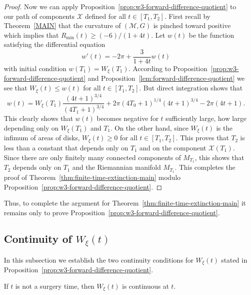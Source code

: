 \begin{proof}
Now we can apply Proposition~\ref{prop:w3-forward-difference-quotient} to our path of components
${\mathcal X}$ defined for all $t\in [T_1,T_2]$. First recall by
Theorem~\ref{MAIN} that the curvature of $({\mathcal M},G)$ is pinched toward
positive which implies that $R_{\min}(t)\ge (-6)/(1+4t)$. Let $w(t)$ be the
function satisfying the differential equation
$$w'(t)=-2\pi+\frac{3}{1+4t}w(t)$$
with initial condition $w(T_1)=W_\xi(T_1)$. According to
Proposition~\ref{prop:w3-forward-difference-quotient} and Proposition~\ref{lem:forward-difference-quotient} we
see that $W_\xi(t)\le w(t)$ for all $t\in [T_1,T_2]$. But direct
integration shows that
$$w(t)=W_\xi(T_1)\frac{(4t+1)^{3/4}}{(4T_1+1)^{3/4}}+2\pi
(4T_0+1)^{1/4}(4t+1)^{3/4}-2\pi (4t+1).$$ This clearly shows that
$w(t)$ becomes negative for $t$ sufficiently large, how large
depending only on $W_\xi(T_1)$ and $T_1$. On the other hand, since
$W_\xi(t)$ is the infimum of areas of disks, $W_\xi(t)\ge 0$ for all
$t\in [T_1,T_2]$. This proves that $T_2$ is less than a constant
that depends only on $T_1$ and on the component ${\mathcal X}(T_1)$.
Since there are only finitely many connected components of
$M_{T_1}$, this shows that $T_2$ depends only on $T_1$ and the
Riemannian manifold $M_{T_1}$. This completes the proof of
Theorem~\ref{thm:finite-time-extinction-main} modulo Proposition~\ref{prop:w3-forward-difference-quotient}.
\end{proof}

Thus, to complete the argument for Theorem~\ref{thm:finite-time-extinction-main} it remains
only to prove Proposition~\ref{prop:w3-forward-difference-quotient}.


\subsection{Continuity of $W_\xi(t)$}

In this subsection we establish the two continuity conditions for
$W_\xi(t)$ stated in Proposition~\ref{prop:w3-forward-difference-quotient}.

\begin{claim}
\label{claim:w-xi-continuity-nonsurgery}
If $t$ is not a surgery time, then $W_\xi(t)$ is continuous at $t$.
\end{claim}

